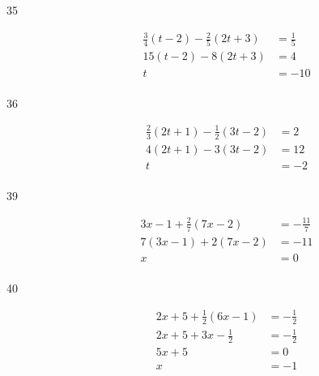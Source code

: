 \documentclass[letterpaper, landscape]{exam}
\begin{document}
\begin{description}
      \item[35]
        \begin{align*}
          \frac{3}{4}(t - 2) - \frac{2}{5}(2t + 3) & = \frac{1}{5} \\
          15(t - 2) - 8(2t + 3)                    & = 4 \\
          t                                        & = \boxed{ -10 } \\
        \end{align*}

      \item[36] 
        \begin{align*}
          \frac{2}{3} (2t + 1) - \frac{1}{2} (3t - 2) & = 2 \\
          4(2t + 1) - 3(3t - 2)                       & = 12 \\
          t                                           & = \boxed{ -2 } \\
        \end{align*}


      \item[39]
        \begin{align*}
          3x - 1 + \frac{2}{7}(7x - 2) & = - \frac{11}{7} \\
          7(3x - 1) + 2(7x - 2)        & = -11 \\
          x                            & = \boxed{ 0 } \\
        \end{align*}

      \item[40]
        \begin{align*}
          2x + 5 + \frac{1}{2}(6x - 1) & = -\frac{1}{2} \\
          2x + 5 + 3x - \frac{1}{2}    & = -\frac{1}{2} \\
          5x + 5                       & = 0 \\
          x                            & = \boxed{ -1 } \\
        \end{align*}


\end{description}
\end{document}

